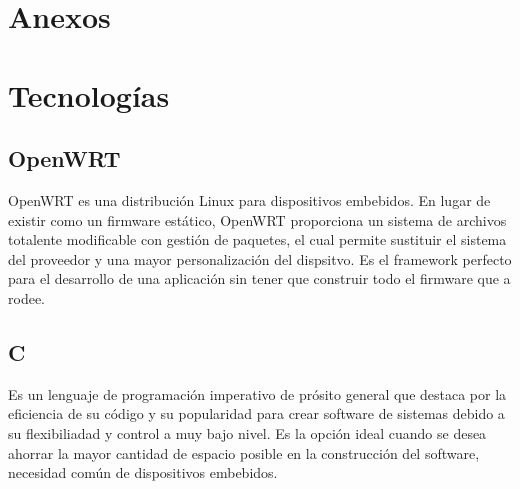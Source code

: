 \documentclass[12pt]{article}
\begin{document}










\section{Anexos}



\section{Tecnologías}
    \subsection{OpenWRT}
        OpenWRT es una distribución Linux para dispositivos embebidos. En lugar de existir como un firmware estático, OpenWRT proporciona un sistema de archivos totalente modificable con gestión de paquetes, el cual permite sustituir el sistema del proveedor y una mayor personalización del dispsitvo. Es el framework perfecto para el desarrollo de una aplicación sin tener que construir todo el firmware que a rodee.

    \subsection{C}
        Es un lenguaje de programación imperativo de prósito general que destaca por la eficiencia de su código y su popularidad para crear software de sistemas debido a su flexibiliadad y control a muy bajo nivel. Es la opción ideal cuando se desea ahorrar la mayor cantidad de espacio posible en la construcción del software, necesidad común de dispositivos embebidos. 
\end{document}
